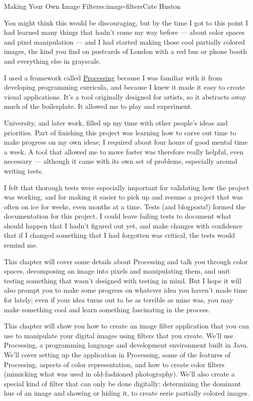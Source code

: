 \begin{aosachapter}{Making Your Own Image Filters}{s:image-filters}{Cate Huston}

You might think this would be discouraging, but by the time I got to
this point I had learned many things that hadn't come my way before ---
about color spaces and pixel manipulation --- and I had started making
those cool partially colored images, the kind you find on postcards of
London with a red bus or phone booth and everything else in grayscale.

I used a framework called \href{https://processing.org/}{Processing}
because I was familiar with it from developing programming curricula,
and because I knew it made it easy to create visual applications. It's a
tool originally designed for artists, so it abstracts away much of the
boilerplate. It allowed me to play and experiment.

University, and later work, filled up my time with other people's ideas
and priorities. Part of finishing this project was learning how to carve
out time to make progress on my own ideas; I required about four hours
of good mental time a week. A tool that allowed me to move faster was
therefore really helpful, even necessary --- although it came with its
own set of problems, especially around writing tests.

I felt that thorough tests were especially important for validating how
the project was working, and for making it easier to pick up and resume
a project that was often on ice for weeks, even months at a time. Tests
(and blogposts!) formed the documentation for this project. I could
leave failing tests to document what should happen that I hadn't figured
out yet, and make changes with confidence that if I changed something
that I had forgotten was critical, the tests would remind me.

This chapter will cover some details about Processing and talk you
through color spaces, decomposing an image into pixels and manipulating
them, and unit testing something that wasn't designed with testing in
mind. But I hope it will also prompt you to make some progress on
whatever idea you haven't made time for lately; even if your idea turns
out to be as terrible as mine was, you may make something cool and learn
something fascinating in the process.

\label{the-app}

This chapter will show you how to create an image filter application
that you can use to manipulate your digital images using filters that
you create. We'll use Processing, a programming language and development
environment built in Java. We'll cover setting up the application in
Processing, some of the features of Processing, aspects of color
representation, and how to create color filters (mimicking what was used
in old-fashioned photography). We'll also create a special kind of
filter that can only be done digitally: determining the dominant hue of
an image and showing or hiding it, to create eerie partially colored
images.


\end{aosachapter}

